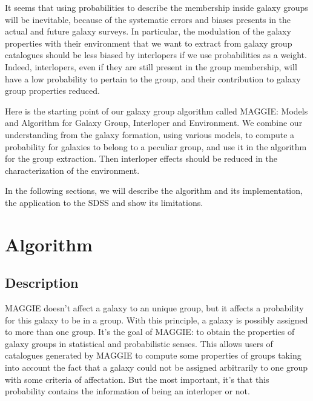It seems that using probabilities to describe the membership inside galaxy
groups will be inevitable, because of the systematic errors and biases presents
in the actual and future galaxy surveys. In particular, the modulation of the
galaxy properties with their environment that we want to extract from galaxy
group catalogues should be less biased by interlopers if we use probabilities
as a weight. Indeed, interlopers, even if they are still present in the group
membership, will have a low probability to pertain to the group, and their
contribution to galaxy group properties reduced.

Here is the starting point of our galaxy group algorithm called MAGGIE\@:
Models and Algorithm for Galaxy Group, Interloper and Environment. We combine
our understanding from the galaxy formation, using various models, to compute a
probability for galaxies to belong to a peculiar group, and use it in the
algorithm for the group extraction. Then interloper effects should be reduced
in the characterization of the environment.

In the following sections, we will describe the algorithm and its
implementation, the application to the SDSS and show its limitations.

\section{Algorithm}
\label{sec:algorithm}

\subsection{Description}
\label{sub:maggie_description}

MAGGIE doesn't affect a galaxy to an unique group, but it affects a probability
for this galaxy to be in a group. With this principle, a galaxy is possibly
assigned to more than one group. It's the goal of MAGGIE\@: to obtain the
properties of galaxy groups in statistical and probabilistic senses. This
allows users of catalogues generated by MAGGIE to compute some properties of
groups taking into account the fact that a galaxy could not be assigned
arbitrarily to one group with some criteria of affectation. But the most
important, it's that this probability contains the information of being an
interloper or not.

